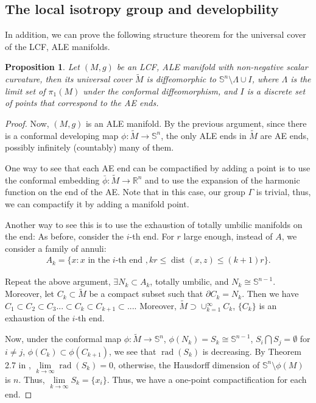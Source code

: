 \documentclass[12pt]{amsart}
\newtheorem{proposition}[theorem]{Proposition}
\theoremstyle{definition}
\begin{document}
\subsection{The local isotropy group and developbility}\label{isotropy ALE section}
In addition, we can prove the following structure theorem for the universal cover of the LCF, ALE manifolds.
\begin{proposition}\label{ALE structure}
    Let $(M,g)$ be an LCF, ALE manifold with non-negative scalar curvature, then its universal cover $\tilde{M}$ is diffeomorphic to $\mathbb{S}^n\setminus\Lambda\cup I$, where $\Lambda$ is the limit set of $\pi_1(M)$ under the conformal diffeomorphism, and $I$ is a discrete set of points that correspond to the AE ends.
\end{proposition}
\begin{proof}
    Now, $(M,g)$ is an ALE manifold. By the previous argument, since there is a conformal developing map $\phi:\tilde{M}\to \mathbb{S}^n$, the only ALE ends in $\tilde{M}$ are AE ends, possibly infinitely (countably) many of them.

    One way to see that each AE end can be compactified by adding a point is to use the conformal embedding $\bar{\phi}:\tilde{M}\to\mathbb{R}^n$ and to use the expansion of the harmonic function on the end of the AE. Note that in this case, our group $\Gamma$ is trivial, thus, we can compactify it by adding a manifold point.

    Another way to see this is to use the exhaustion of totally umbilic manifolds on the end: As before, consider the $i$-th end. For $r$ large enough, instead of $A$, we consider a family of annuli:
  \begin{align*}
      A_k=\{x:x\text{ in the $i$-th end }, kr\leq \operatorname{dist}(x,z)\leq (k+1)r\}.
  \end{align*}
  
  Repeat the above argument, $\exists N_k\subset A_k$, totally umbilic, and $N_k\cong\mathbb{S}^{n-1}$. Moreover, let $C_k\subset \tilde{M}$ be a compact subset such that $\partial C_k=N_k$. Then we have $C_1\subset C_2\subset C_3...\subset C_k\subset C_{k+1}\subset...$. Moreover, $\tilde{M}\supset \cup_{k=1}^\infty C_k$, $\{C_k\}$ is an exhaustion of the $i$-th end. 
  
  Now, under the conformal map $\phi:\tilde{M}\to\mathbb{S}^n$, $\phi(N_k)=S_k\cong\mathbb{S}^{n-1}$, $S_i\bigcap S_j=\emptyset$ for $i\neq j$, $\phi(C_k)\subset\phi(C_{k+1})$, we see that $\operatorname{rad}(S_k)$ is decreasing. By Theorem 2.7 in \cite{SYconformal}, $\lim\limits_{k\to\infty}\operatorname{rad}(S_k)=0$, otherwise, the Hausdorff dimension of $\mathbb{S}^n\setminus\phi(M)$ is $n$. Thus, $\lim\limits_{k\to\infty}S_k=\{x_i\}$. Thus, we have a one-point compactification for each end.


\end{proof}
\end{document}
